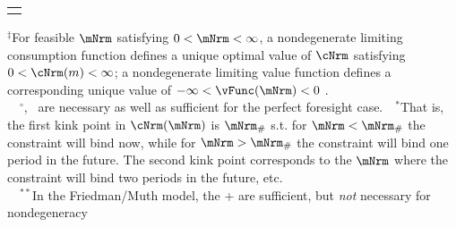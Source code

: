 \begin{table}
{\begin{tabular}{|l|l|l|}
        \\ \hline \multicolumn{3}{c}{}
      \end{tabular}
    } %

    \settowidth\TableWidth{\usebox{\TblBox}}
    \savebox{\TblShrunkBox}{
      \settowidth{\TblShrunk}{\usebox{\TblBox}}
      \resizebox{\textwidth}{!}{\begin{minipage}{\TblShrunk}
          \usebox{\TblBox}
        \end{minipage}}
    }

    \usebox{\TblShrunkBox}


    \parbox{\textwidth}{\raggedright \footnotesize         $^{\ddagger}$For feasible $\mNrm$ satisfying $0 < \mNrm < \infty$, a nondegenerate limiting consumption function defines a unique optimal value of $\cNrm$ satisfying $0 < \cNrm(m) < \infty$; a nondegenerate limiting value function defines a corresponding unique value of $-\infty < \vFunc(\mNrm) < 0$ .\\
      ~~$^{\circ}${\RIC}, \FHWC~are necessary as well as sufficient for the perfect foresight case.~~$^{\ast}$That is, the first kink point in $\cNrm(\mNrm)$ is $\mNrm_{\#}$ s.t. for $\mNrm < \mNrm_{\#}$ the constraint will bind now, while for $\mNrm > \mNrm_{\#}$ the constraint will bind one period in the future.  The second kink point corresponds to the $\mNrm$ where the constraint will bind two periods in the future, etc.\\
      ~~$^{\ast\ast}$In the Friedman/Muth model, the {\RIC}+{\FHWC} are sufficient, but \textit{not} necessary for nondegeneracy}
  \end{table}

